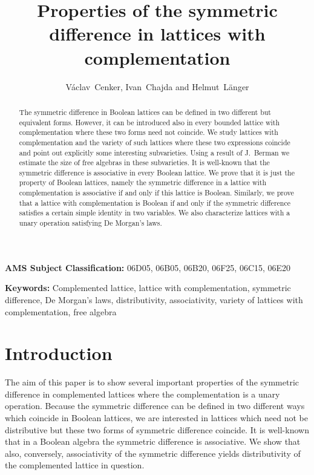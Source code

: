 \documentclass[12pt]{article}
\title{Properties of the symmetric difference in lattices with complementation}
\author{V\'aclav~Cenker, Ivan~Chajda and Helmut~L\"anger}
\date{}
\begin{document}

\maketitle
	
\begin{abstract}
The symmetric difference in Boolean lattices can be defined in two different but equivalent forms. However, it can be introduced also in every bounded lattice with complementation where these two forms need not coincide. We study lattices with complementation and the variety of such lattices where these two expressions coincide and point out explicitly some interesting subvarieties. Using a result of J.~Berman we estimate the size of free algebras in these subvarieties. It is well-known that the symmetric difference is associative in every Boolean lattice. We prove that it is just the property of Boolean lattices, namely the symmetric difference in a lattice with complementation is associative if and only if this lattice is Boolean. Similarly, we prove that a lattice with complementation is Boolean if and only if the symmetric difference satisfies a certain simple identity in two variables. We also characterize lattices with a unary operation satisfying De Morgan's laws.
\end{abstract}
	
{\bf AMS Subject Classification:} 06D05, 06B05, 06B20, 06F25, 06C15, 06E20
	
{\bf Keywords:} Complemented lattice, lattice with complementation, symmetric difference, De Morgan's laws, distributivity, associativity, variety of lattices with complementation, free algebra

\section{Introduction}
The aim of this paper is to show several important properties of the symmetric difference in complemented lattices where the complementation is a unary operation. Because the symmetric difference can be defined in two different ways which coincide in Boolean lattices, we are interested in lattices which need not be distributive but these two forms of symmetric difference coincide. It is well-known that in a Boolean algebra the symmetric difference is associative. We show that also, conversely, associativity of the symmetric difference yields distributivity of the complemented lattice in question.
\end{document}
